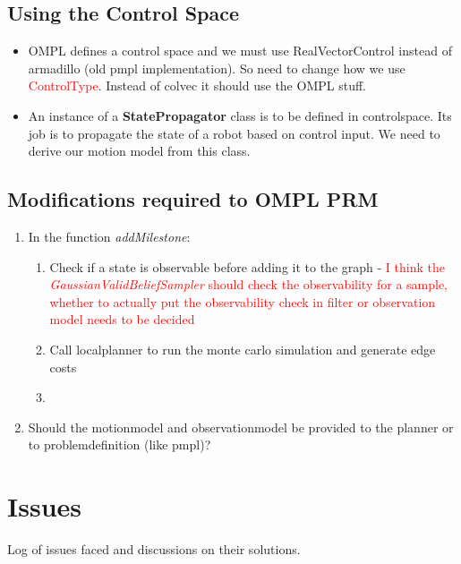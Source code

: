 \subsection{Using the Control Space}

\begin{itemize}
 \item OMPL defines a control space and we must use RealVectorControl instead of armadillo (old pmpl implementation). So need to change how we use \textcolor{red}{ControlType}. Instead of colvec it should use the OMPL stuff. 
 
 \item An instance of a \textbf{StatePropagator} class is to be defined in controlspace. Its job is to propagate the state of a robot based on control input. We need to  derive      our motion model from this class. 

 \end{itemize}



\subsection{Modifications required to OMPL PRM}

\begin{enumerate}
 \item In the function \textit{addMilestone}:
  \begin{enumerate}
   \item Check if a state is observable before adding it to the graph - \textcolor{red}{I think the \textit{GaussianValidBeliefSampler} should check the observability for a sample, whether to actually put the observability check in filter or observation model needs to be decided} 
   \item Call localplanner to run the monte carlo simulation and generate edge costs
   \item 
  \end{enumerate}

  \item Should the motionmodel and observationmodel be provided to the planner or to problemdefinition (like pmpl)?
\end{enumerate}


\section{Issues}
Log of issues faced and discussions on their solutions.

